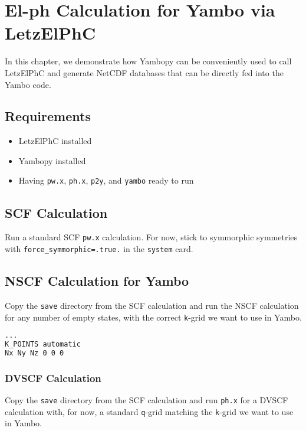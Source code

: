 \documentclass[12pt,twoside,openany]{book}
\begin{document}
%
%
%
%
%
%
%
%

\chapter{El-ph Calculation for Yambo via LetzElPhC}

In this chapter, we demonstrate how Yambopy can be conveniently used to call \\
LetzElPhC and generate NetCDF databases that can be directly fed into the Yambo code.
\section{Requirements}
\begin{itemize}
    \item LetzElPhC installed
    \item Yambopy installed
    \item Having \texttt{pw.x}, \texttt{ph.x}, \texttt{p2y}, and \texttt{yambo} ready to run
\end{itemize}

\section{SCF Calculation}

Run a standard SCF \texttt{pw.x} calculation. For now, stick to symmorphic symmetries with \texttt{force\_symmorphic=.true.} in the \texttt{system} card.

\section{NSCF Calculation for Yambo}

Copy the \texttt{save} directory from the SCF calculation and run the NSCF calculation for any number of empty states, with the correct \texttt{k}-grid we want to use in Yambo.

\begin{lstlisting}[language=make]
...
K_POINTS automatic
Nx Ny Nz 0 0 0
\end{lstlisting}

\subsection*{DVSCF Calculation}

Copy the \texttt{save} directory from the SCF calculation and run \texttt{ph.x} for a DVSCF calculation with, for now, a standard \texttt{q}-grid matching the \texttt{k}-grid we want to use in Yambo.
\end{document}
